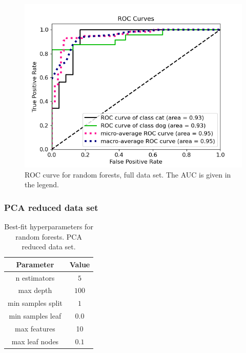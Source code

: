\documentclass[a4paper]{article}
\begin{document}
\begin{figure}[H]
	\centering
	\includegraphics[scale=0.5]{../figures/random_forest/roc_nbins200_pca0_seed4155_ts0.20.png}
	\caption{ROC curve for random forests, full data set. The AUC is given in the legend.}
	\label{fig:rf_roc_nonpca}
\end{figure}	

\subsubsection{PCA reduced data set}

\begin{table}[H]
  \centering
  \caption{Best-fit hyperparameters for random forests. PCA reduced data set.}
  \label{tab:best_fit_rf_pca}
  \begin{tabular}{c|c}
    \hline\hline
    Parameter & Value\\\hline
    n estimators &  $5$\\
    max depth &  $100$\\
    min samples split & $1$ \\
    min samples leaf  & $0.0$\\
    max features & 10 \\
    max leaf nodes & $0.1$
    \end{tabular}
\end{table}
\end{document}
